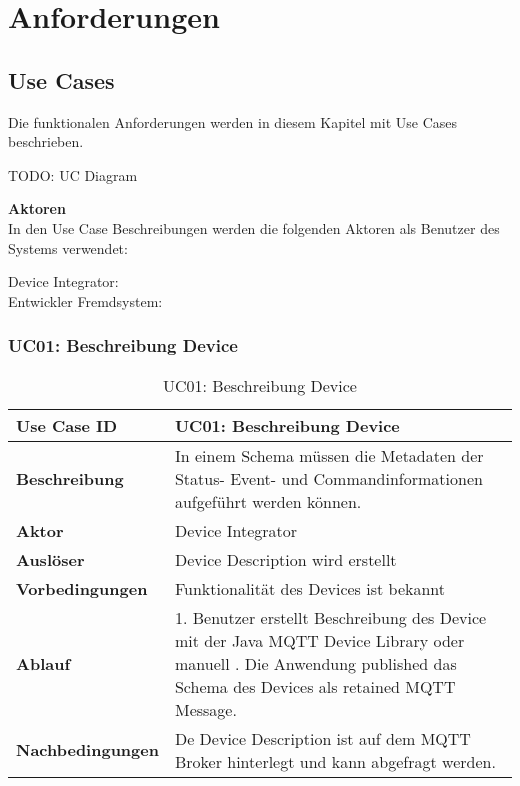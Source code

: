 \chapter{Anforderungen}
\label{chap:requirements}

\section{Use Cases}
Die funktionalen Anforderungen werden in diesem Kapitel mit Use Cases beschrieben.

TODO: UC Diagram

\textbf{Aktoren} \\
In den Use Case Beschreibungen werden die folgenden Aktoren als Benutzer des Systems verwendet:

Device Integrator:       \\
Entwickler Fremdsystem:  \\

\subsection{UC01: Beschreibung Device}

\begin{table}[H]
\begin{tabularx}{\textwidth}{|l|X|}

 \hline
 {\bf Use Case ID }    & UC01: Beschreibung Device \\  \hline
 {\bf Beschreibung }   & In einem Schema müssen die Metadaten der Status- Event- und Commandinformationen aufgeführt werden können.
 \\ \hline
 {\bf Aktor }          & Device Integrator \\ \hline
 {\bf Auslöser }       & Device Description wird erstellt \\ \hline
 {\bf Vorbedingungen } & Funktionalität des Devices ist bekannt \\ \hline
 {\bf Ablauf }         & 
     1. Benutzer erstellt Beschreibung des Device mit der Java MQTT Device Library oder manuell \newline                                             
     2. Die Anwendung published das Schema des Devices als retained MQTT Message.  \\ \hline
 {\bf Nachbedingungen} & De Device Description ist auf dem MQTT Broker hinterlegt und kann abgefragt werden. \\ \hline
  
\end{tabularx}
\caption{UC01: Beschreibung Device}
\end{table}

